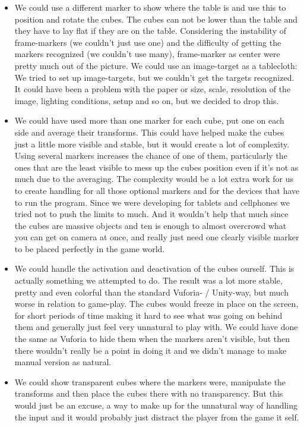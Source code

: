 \begin{itemize}
  \item We could use a different marker to show where the table is and use this to position and rotate the cubes. 
  The cubes can not be lower than the table and they have to lay flat if they are on the table. 
  Considering the instability of frame-markers (we couldn't just use one) and the difficulty of getting the markers recognized (we couldn't use many), frame-marker as center were pretty much out of the picture. 
  We could use an image-target as a tablecloth: 
  We tried to set up image-targets, but we couldn't get the targets recognized. 
  It could have been a problem with the paper or size, scale, resolution of the image, lighting conditions, setup and so on, but we decided to drop this.
  \item We could have used more than one marker for each cube, put one on each side and average their transforms. 
  This could have helped make the cubes just a little more visible and stable, but it would create a lot of complexity. 
  Using several markers increases the chance of one of them, particularly the ones that are the least visible to mess up the cubes position even if it's not as much due to the averaging. 
  The complexity would be a lot extra work for us to create handling for all those optional markers and for the devices that have to run the program. 
  Since we were developing for tablets and cellphones we tried not to push the limits to much. 
  And it wouldn't help that much since the cubes are massive objects and ten is enough to almost overcrowd what you can get on camera at once, and really just need one clearly visible marker to be placed perfectly in the game world.
  \item We could handle the activation and deactivation of the cubes ourself. 
  This is actually something we attempted to do. 
  The result was a lot more stable, pretty and even colorful than the standard Vuforia- / Unity-way, but much worse in relation to game-play. 
  The cubes would freeze in place on the screen, for short periods of time making it hard to see what was going on behind them and generally just feel very unnatural to play with. 
  We could have done the same as Vuforia to hide them when the markers aren't visible, but then there wouldn't really be a point in doing it and we didn't manage to make manual version as natural. 
  \item We could show transparent cubes where the markers were, manipulate the transforms and then place the cubes there with no transparency. 
  But this would just be an excuse, a way to make up for the unnatural way of handling the input and it would probably just distract the player from the game it self.
\end{itemize}


